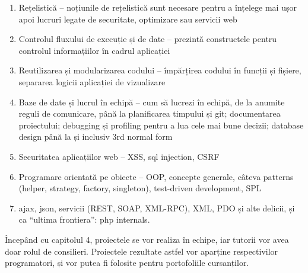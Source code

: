 \begin{enumerate}

\item Rețelistică -- noțiunile de rețelistică sunt necesare pentru a înțelege
    mai ușor apoi lucruri legate de securitate, optimizare sau servicii web

\item Controlul fluxului de execuție și de date -- prezintă constructele pentru
    controlul informațiilor în cadrul aplicației

\item Reutilizarea și modularizarea codului -- împărțirea codului în funcții și
    fișiere, separarea logicii aplicației de vizualizare

\item Baze de date și lucrul în echipă -- cum să lucrezi în echipă, de la
    anumite reguli de comunicare, până la planificarea timpului și git;
    documentarea proiectului; debugging și profiling pentru a lua cele mai bune
    decizii; database design până la și inclusiv 3rd normal form

\item Securitatea aplicațiilor web -- XSS, sql injection, CSRF

\item Programare orientată pe obiecte -- OOP, concepte generale, câteva patterns
    (helper, strategy, factory, singleton), test-driven development, SPL

\item ajax, json, servicii (REST, SOAP, XML-RPC), XML, PDO și alte delicii, și
    ca ``ultima frontiera'': php internals.

\end{enumerate}

Începând cu capitolul 4, proiectele se vor realiza în echipe, iar tutorii vor
avea doar rolul de consilieri. Proiectele rezultate astfel vor aparține
respectivilor programatori, și vor putea fi folosite pentru portofoliile
cursanților.

